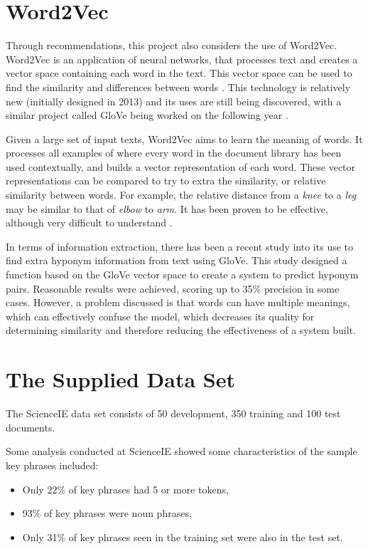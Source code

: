 \section{Word2Vec}
Through recommendations, this project also considers the use of Word2Vec. Word2Vec is an application of neural networks, that processes text and creates a vector space containing each word in the text. This vector space can be used to find the similarity and differences between words \cite{Mikolov2013}. This technology is relatively new (initially designed in 2013) and its uses are still being discovered, with a similar project called GloVe being worked on the following year \cite{Pennington2014}.

Given a large set of input texts, Word2Vec aims to learn the meaning of words. It processes all examples of where every word in the document library has been used contextually, and builds a vector representation of each word. These vector representations can be compared to try to extra the similarity, or relative similarity between words. For example, the relative distance from a \textit{knee} to a \textit{leg} may be similar to that of \textit{elbow} to \textit{arm}. It has been proven to be effective, although very difficult to understand \cite{Goldberg2014}. 

In terms of information extraction, there has been a recent study into its use to find extra hyponym information from text \cite{Nayak2015} using GloVe. This study designed a function based on the GloVe vector space to create a system to predict hyponym pairs. Reasonable results were achieved, scoring up to 35\% precision in some cases. However, a problem discussed is that words can have multiple meanings, which can effectively confuse the model, which decreases its quality for determining similarity and therefore reducing the effectiveness of a system built. 

\section{The Supplied Data Set}
The ScienceIE data set consists of 50 development, 350 training and 100 test documents. 

Some analysis conducted at ScienceIE \cite{Augenstein2017} showed some characteristics of the sample key phrases included:
\begin{itemize}
	\item Only 22\% of key phrases had 5 or more tokens,
	\item 93\% of key phrases were noun phrases,
	\item Only 31\% of key phrases seen in the training set were also in the test set.
\end{itemize}

